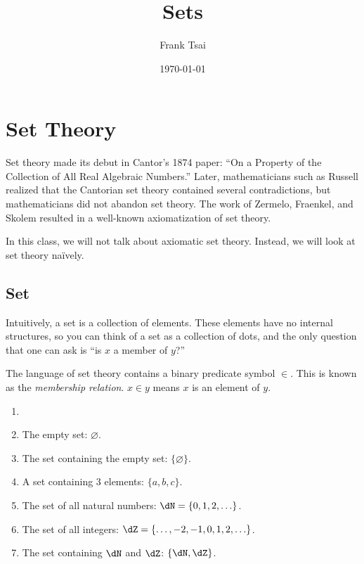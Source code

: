 \documentclass{amsart}
\title{Sets}
\author{Frank Tsai}
\date{\today}
\begin{document}
\maketitle
\tableofcontents

\section{Set Theory}
\label{sec:basic-set-theory}

Set theory made its debut in Cantor's 1874 paper: ``On a Property of the Collection of All Real Algebraic Numbers.''
Later, mathematicians such as Russell realized that the Cantorian set theory contained several contradictions, but mathematicians did not abandon set theory.
The work of Zermelo, Fraenkel, and Skolem resulted in a well-known axiomatization of set theory.

In this class, we will not talk about axiomatic set theory.
Instead, we will look at set theory na\"ively.

\subsection{Set}
\label{sec:set}

Intuitively, a set is a collection of elements.
These elements have no internal structures, so you can think of a set as a collection of dots, and the only question that one can ask is ``is $x$ a member of $y$?''

The language of set theory contains a binary predicate symbol $\in$.
This is known as the \emph{membership relation}.
$x \in y$ means $x$ is an element of $y$.

\begin{eg}
  \begin{enumerate}
  \item[]
  \item The empty set: $\varnothing$.
  \item The set containing the empty set: $\{\varnothing\}$.
  \item A set containing 3 elements: $\{ a,b,c \}$.
  \item The set of all natural numbers: $\dN = \{ 0,1,2,\ldots \}$.
  \item The set of all integers: $\dZ = \{ \ldots,-2,-1,0,1,2,\ldots \}$.
  \item The set containing $\dN$ and $\dZ$: $\{ \dN,\dZ \}$.
  \end{enumerate}
\end{eg}
\end{document}
